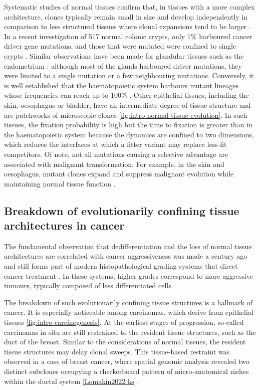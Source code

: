 Systematic studies of normal tissues confirm that, in tissues with a more complex architecture, clones typically remain small in size and develop independently in comparison to less structured tissues where clonal expansions tend to be larger \parencite{Li2021-th}. In a recent investigation of 517 normal colonic crypts, only 1\% harboured cancer driver gene mutations, and those that were mutated were confined to single crypts \parencite{Lee-Six2019-fy}. Similar observations have been made for glandular tissues such as the endometrium \parencite{Moore2020-qb}: although most of the glands harboured driver mutations, they were limited to a single mutation or a few neighbouring mutations. Conversely, it is well established that the haematopoietic system harbours mutant lineages whose frequencies can reach up to 100\% \parencite{Genovese2014-wm,Jaiswal2014-tz}. Other epithelial tissues, including the skin, oesophagus or bladder, have an intermediate degree of tissue structure and are patchworks of microscopic clones \parencite{Moore2021-yr,Martincorena2015-yu,Martincorena2018-rl,Lawson2020-as} \cref{fig:intro-normal-tissue-evolution}. In such tissues, the fixation probability is high but the time to fixation is greater than in the haematopoietic system because the dynamics are confined to two dimensions, which reduces the interfaces at which a fitter variant may replace less-fit competitors. Of note, not all mutations causing a selective advantage are associated with malignant transformation. For example, in the skin and oesophagus,  mutant clones expand and suppress malignant evolution while maintaining normal tissue function \parencite{Martincorena2015-yu,Martincorena2018-rl, Colom2021-mk,Fowler2021-bl, Abby2021-ik}.

\subsection*{Breakdown of evolutionarily confining tissue architectures in cancer
}
The fundamental observation that dedifferentiation and the loss of normal tissue architectures are correlated with cancer aggressiveness was made a century ago and still forms part of modern histopathological grading systems that direct cancer treatment \parencite{Louis2007-ia,Elston1991-md,Epstein2016-un,Greenough1925-wg}. In these systems, higher grades correspond to more aggressive tumours, typically composed of less differentiated cells.

The breakdown of such evolutionarily confining tissue structures is a hallmark of cancer. It is especially noticeable among carcinomas, which derive from epithelial tissues \cref{fig:intro-carcinogenesis}. At the earliest stages of progression, so-called carcinomas in situ are still restrained to the resident tissue structures, such as the duct of the breast. Similar to the considerations of normal tissues, the resident tissue structures may delay clonal sweeps. This tissue-based restraint was observed in a case of breast cancer, where spatial genomic analysis revealed two distinct subclones occupying a checkerboard pattern of micro-anatomical niches within the ductal system \cref{Lomakin2022-ks}.

